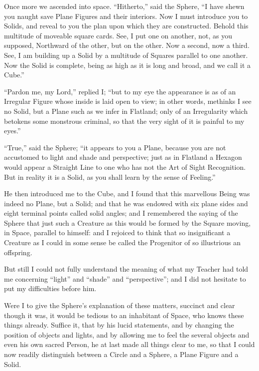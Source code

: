 \documentclass[12pt, a4paper, oneside]{memoir}
\begin{document}
Once more we ascended into space. ``Hitherto,'' said the Sphere, ``I have shewn
you naught save Plane Figures and their interiors. Now I must introduce you to
Solids, and reveal to you the plan upon which they are constructed. Behold
this multitude of moveable square cards. See, I put one on another, not, as
you supposed, Northward of the other, but on the other. Now a second, now a
third. See, I am building up a Solid by a multitude of Squares parallel to one
another. Now the Solid is complete, being as high as it is long and broad, and
we call it a Cube.''

``Pardon me, my Lord,'' replied I; ``but to my eye the appearance is as of an
Irregular Figure whose inside is laid open to view; in other words, methinks I
see no Solid, but a Plane such as we infer in Flatland; only of an
Irregularity which betokens some monstrous criminal, so that the very sight of
it is painful to my eyes.''

``True,'' said the Sphere; ``it appears to you a Plane, because you are not
accustomed to light and shade and perspective; just as in Flatland a Hexagon
would appear a Straight Line to one who has not the Art of Sight Recognition.
But in reality it is a Solid, as you shall learn by the sense of Feeling.''

He then introduced me to the Cube, and I found that this marvellous Being was
indeed no Plane, but a Solid; and that he was endowed with six plane sides and
eight terminal points called solid angles; and I remembered the saying of the
Sphere that just such a Creature as this would be formed by the Square moving,
in Space, parallel to himself: and I rejoiced to think that so insignificant a
Creature as I could in some sense be called the Progenitor of so illustrious
an offspring.

But still I could not fully understand the meaning of what my Teacher had told
me concerning ``light'' and ``shade'' and ``perspective''; and I did not hesitate to
put my difficulties before him.

Were I to give the Sphere's explanation of these matters, succinct and clear
though it was, it would be tedious to an inhabitant of Space, who knows these
things already. Suffice it, that by his lucid statements, and by changing the
position of objects and lights, and by allowing me to feel the several objects
and even his own sacred Person, he at last made all things clear to me, so
that I could now readily distinguish between a Circle and a Sphere, a Plane
Figure and a Solid.
\end{document}
